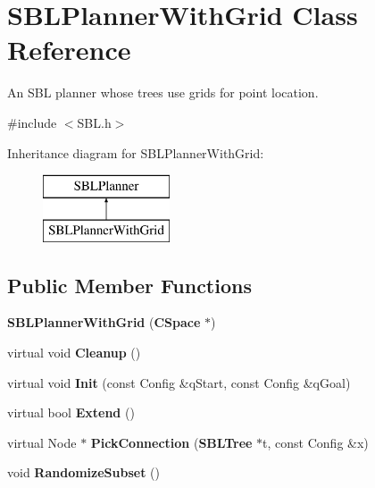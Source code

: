 \section{S\+B\+L\+Planner\+With\+Grid Class Reference}
\label{classSBLPlannerWithGrid}


An S\+BL planner whose trees use grids for point location.  




{\ttfamily \#include $<$S\+B\+L.\+h$>$}

Inheritance diagram for S\+B\+L\+Planner\+With\+Grid\+:\begin{figure}[H]
\begin{center}
\leavevmode
\includegraphics[height=2.000000cm]{classSBLPlannerWithGrid}
\end{center}
\end{figure}
\subsection*{Public Member Functions}
\begin{DoxyCompactItemize}
\item 
{\bfseries S\+B\+L\+Planner\+With\+Grid} ({\bf C\+Space} $\ast$)\label{classSBLPlannerWithGrid_ab190515375538d65152fb87a377957e8}

\item 
virtual void {\bfseries Cleanup} ()\label{classSBLPlannerWithGrid_aae4120821b162b089edb3f3e192b3805}

\item 
virtual void {\bfseries Init} (const Config \&q\+Start, const Config \&q\+Goal)\label{classSBLPlannerWithGrid_a877d3616dbe353e4005d712fe203368c}

\item 
virtual bool {\bfseries Extend} ()\label{classSBLPlannerWithGrid_a15fceeb69521215cfb55d7a90f4098a3}

\item 
virtual Node $\ast$ {\bfseries Pick\+Connection} ({\bf S\+B\+L\+Tree} $\ast$t, const Config \&x)\label{classSBLPlannerWithGrid_a1a6adeae4cf85b853a525c8bb9d5b0b2}

\item 
void {\bfseries Randomize\+Subset} ()\label{classSBLPlannerWithGrid_a7d702a676538d8c9ed892dcb4380d8c9}

\end{DoxyCompactItemize}
